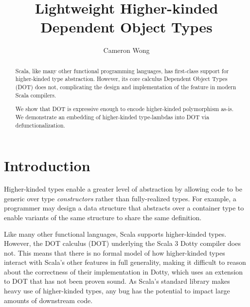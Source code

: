 \documentclass[acmsmall,screen]{acmart}
\begin{document}
\title{Lightweight Higher-kinded Dependent Object Types}

\author{Cameron Wong}

\renewcommand{\shortauthors}{Cameron Wong}

\renewcommand\footnotetextcopyrightpermission[1]{}
\pagestyle{fancy}
\fancyfoot{}
\makeatletter
\let\@authorsaddresses\@empty
\makeatother

\begin{abstract}
  Scala, like many other functional programming languages, has first-class
  support for higher-kinded type abstraction. However, its core calculus
  Dependent Object Types (DOT) does not, complicating the design and
  implementation of the feature in modern Scala compilers.

  We show that DOT is expressive enough to encode higher-kinded polymorphism
  as-is. We demonstrate an embedding of higher-kinded type-lambdas into DOT via
  defunctionalization.
\end{abstract}


\maketitle
\thispagestyle{firstfancy}

\section{Introduction}

Higher-kinded types enable a greater level of abstraction by allowing code to
be generic over type \emph{constructors} rather than fully-realized types. For
example, a programmer may design a data structure that abstracts over a
container type to enable variants of the same structure to share the same
definition.

Like many other functional languages, Scala supports higher-kinded types.
However, the DOT calculus (DOT) \cite{Amin_Grutter_Odersky_Rompf_Stucki_2016}
underlying the Scala 3 Dotty compiler does not. This means that there is no
formal model of how higher-kinded types interact with Scala's other features in
full generality, making it difficult to reason about the correctness of their
implementation in Dotty, which uses an extension to DOT that has not been
proven sound. As Scala's standard library makes heavy use of higher-kinded
types, any bug has the potential to impact large amounts of downstream code.
\end{document}
